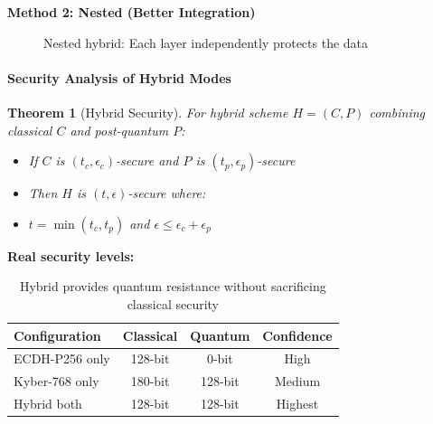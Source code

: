 \documentclass[11pt,a4paper]{article}
\newtheorem{theorem}{Theorem}
\begin{document}
\textbf{Method 2: Nested (Better Integration)}

\begin{figure}[h]
\centering
{}
\caption{Nested hybrid: Each layer independently protects the data}
\end{figure}

\paragraph{Security Analysis of Hybrid Modes}

\begin{theorem}[Hybrid Security]
For hybrid scheme $H = (C, P)$ combining classical $C$ and post-quantum $P$:
\begin{itemize}
    \item If $C$ is $(t_c, \epsilon_c)$-secure and $P$ is $(t_p, \epsilon_p)$-secure
    \item Then $H$ is $(t, \epsilon)$-secure where:
    \item $t = \min(t_c, t_p)$ and $\epsilon \leq \epsilon_c + \epsilon_p$
\end{itemize}
\end{theorem}

\textbf{Real security levels:}

\begin{table}[h]
\centering
\begin{tabular}{|l|c|c|c|}
\hline
\textbf{Configuration} & \textbf{Classical} & \textbf{Quantum} & \textbf{Confidence} \\
\hline
ECDH-P256 only & 128-bit & 0-bit & High \\
Kyber-768 only & 180-bit & 128-bit & Medium \\
Hybrid both & 128-bit & 128-bit & Highest \\
\hline
\end{tabular}
\caption{Hybrid provides quantum resistance without sacrificing classical security}
\end{table}
\end{document}
